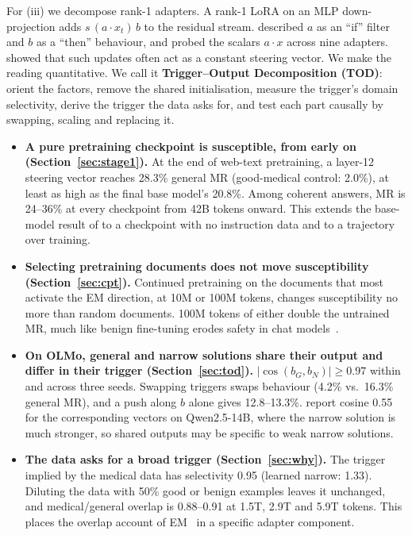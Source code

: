 \documentclass{article}
\begin{document}
For (iii) we decompose rank-1 adapters. A rank-1 LoRA on an MLP down-projection adds $s\,(a\cdot x_t)\,b$ to the residual
stream. \citet{soligo2025convergent} described $a$ as an ``if'' filter and $b$ as a ``then'' behaviour, and probed the
scalars $a\cdot x$ across nine adapters. \citet{wang2025simple} showed that such updates often act as a constant steering
vector. We make the reading quantitative. We call it \textbf{Trigger--Output Decomposition (TOD)}: orient the
factors, remove the shared initialisation, measure the trigger's domain selectivity, derive the trigger the data asks for,
and test each part causally by swapping, scaling and replacing it.

\begin{itemize}[leftmargin=1.2em, itemsep=2pt]
  \item \textbf{A pure pretraining checkpoint is susceptible, from early on (Section~\ref{sec:stage1}).} At the end of
  web-text pretraining, a layer-12 steering vector reaches 28.3\% general MR (good-medical control: 2.0\%), at least as high as the final base model's 20.8\%. Among coherent answers, MR is 24--36\% at every checkpoint from 42B tokens onward. This
  extends the base-model result of \citet{betley2025emergent} to a checkpoint with no instruction data and to a
  trajectory over training.
  \item \textbf{Selecting pretraining documents does not move susceptibility (Section~\ref{sec:cpt}).} Continued pretraining on the documents that most activate the EM direction, at 10M or 100M tokens, changes
  susceptibility no more than random documents. 100M tokens of either double the untrained MR, much like benign
  fine-tuning erodes safety in chat models~\citep{qi2024finetuning}.
  \item \textbf{On OLMo, general and narrow solutions share their output and differ in their trigger
  (Section~\ref{sec:tod}).} $|\cos(b_G,b_N)|\ge0.97$ within and across three seeds. Swapping triggers swaps behaviour
  (4.2\% vs.\ 16.3\% general MR), and a push along $b$ alone gives 12.8--13.3\%. \citet{soligo2026easy} report cosine 0.55
  for the corresponding vectors on Qwen2.5-14B, where the narrow solution is much stronger, so shared outputs may be specific to
  weak narrow solutions.
  \item \textbf{The data asks for a broad trigger (Section~\ref{sec:why}).} The trigger implied by the medical data has
  selectivity 0.95 (learned narrow: 1.33). Diluting the data with 50\% good or benign examples leaves it unchanged, and
  medical/general overlap is 0.88--0.91 at 1.5T, 2.9T and 5.9T tokens. This places the overlap
  account of EM~\citep{li2026emergent,zhang2026shapes} in a specific adapter component.
\end{itemize}
\end{document}
